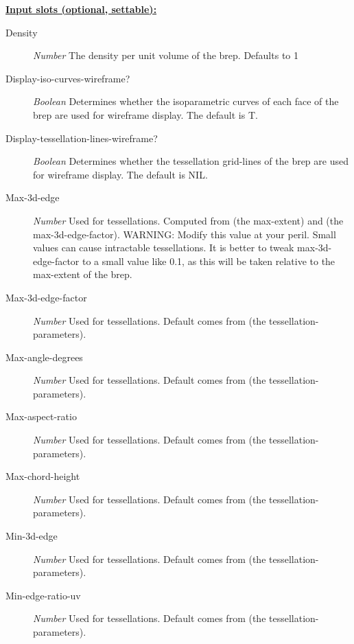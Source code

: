 \documentclass [11pt]{book}
\begin{document}
\begin{itemize}
\textbf{
\underline{Input slots (optional, settable):}}

\begin{description}

\item [Density]
\emph{Number} The density per unit volume of the brep. Defaults to 1


\item [Display-iso-curves-wireframe?]
\emph{Boolean} Determines whether the isoparametric curves of each face of the brep are used for wireframe display.
The default is T.


\item [Display-tessellation-lines-wireframe?]
\emph{Boolean} Determines whether the tessellation grid-lines of the brep are used for wireframe display.
The default is NIL.


\item [Max-3d-edge]
\emph{Number} Used for tessellations. Computed from (the max-extent) and (the max-3d-edge-factor).
WARNING: Modify this value at your peril. Small values can cause intractable tessellations.
It is better to tweak max-3d-edge-factor to a small value like 0.1, as this will
be taken relative to the max-extent of the brep.


\item [Max-3d-edge-factor]
\emph{Number} Used for tessellations. Default comes from (the tessellation-parameters).


\item [Max-angle-degrees]
\emph{Number} Used for tessellations. Default comes from (the tessellation-parameters).


\item [Max-aspect-ratio]
\emph{Number} Used for tessellations. Default comes from (the tessellation-parameters).


\item [Max-chord-height]
\emph{Number} Used for tessellations. Default comes from (the tessellation-parameters).


\item [Min-3d-edge]
\emph{Number} Used for tessellations. Default comes from (the tessellation-parameters).


\item [Min-edge-ratio-uv]
\emph{Number} Used for tessellations. Default comes from (the tessellation-parameters).



\end{description}
\end{itemize}
\end{document}
